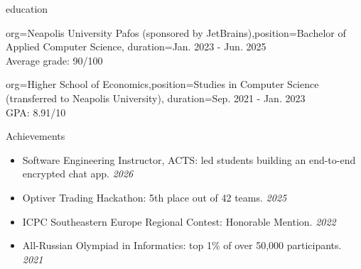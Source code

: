 \documentclass{resume}
\begin{document}
\begin{ResumeSection}{education}
    \begin{ResumeSubsection}{org={Neapolis University Pafos (sponsored by JetBrains)},position={Bachelor of Applied Computer Science}, duration={Jan. 2023 - Jun. 2025}} \\
    Average grade: 90/100
    \end{ResumeSubsection}
	\begin{ResumeSubsection}{org={Higher School of Economics},position={Studies in Computer Science (transferred to Neapolis University)}, duration={Sep. 2021 - Jan. 2023}} \\
    GPA: 8.91/10
    \end{ResumeSubsection}
\end{ResumeSection}

\begin{ResumeSection}{Achievements}
\begin{itemize}
  \item Software Engineering Instructor, ACTS: led students building an end-to-end encrypted chat app. \em\hfill{2026}\em
  \item Optiver Trading Hackathon: 5th place out of 42 teams. \em\hfill{2025}\em
  \item ICPC Southeastern Europe Regional Contest: Honorable Mention. \em\hfill{2022}\em
  \item All-Russian Olympiad in Informatics: top 1\% of over 50,000 participants. \em\hfill{2021}\em
\end{itemize}
\end{ResumeSection}
\end{document}
